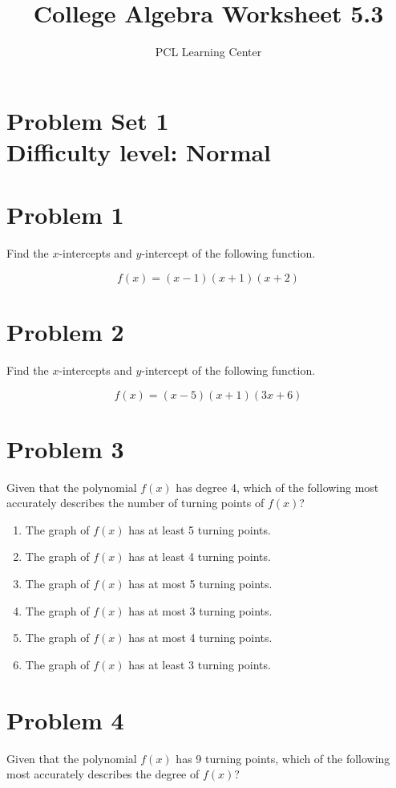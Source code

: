 \documentclass[12pt]{article}
\title{College Algebra Worksheet 5.3}
\author{PCL Learning Center}
\date{}
\begin{document}
\maketitle

\section*{Problem Set 1\\Difficulty level: Normal}
\section*{Problem 1}
Find the $x$-intercepts and $y$-intercept of the following function.

\[ f(x) = (x - 1)(x + 1)(x + 2) \]

\section*{Problem 2}
Find the $x$-intercepts and $y$-intercept of the following function.

\[ f(x) = (x - 5)(x + 1)(3x + 6) \]

\section*{Problem 3}
Given that the polynomial $f(x)$ has degree 4, which of the following most accurately describes the number of turning points of $f(x)$?

\begin{enumerate}[label=(\Alph*)]
    \item The graph of $f(x)$ has at least 5 turning points.
    \item The graph of $f(x)$ has at least 4 turning points.
    \item The graph of $f(x)$ has at most 5 turning points.
    \item The graph of $f(x)$ has at most 3 turning points.
    \item The graph of $f(x)$ has at most 4 turning points.
    \item The graph of $f(x)$ has at least 3 turning points.
\end{enumerate}

\section*{Problem 4}
Given that the polynomial $f(x)$ has 9 turning points, which of the following most accurately describes the degree of $f(x)$?
\end{document}
